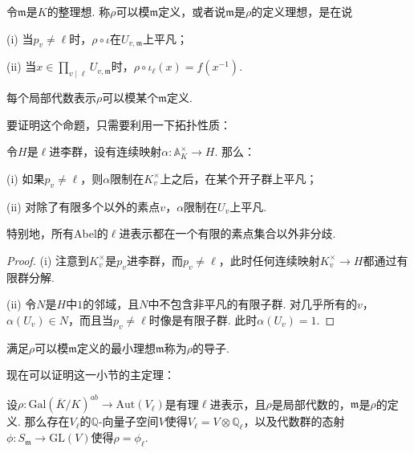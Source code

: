 \begin{cdef}
    令$\mathfrak{m}$是$K$的整理想. 称$\rho$可以模$\mathfrak{m}$定义，或者说$\mathfrak{m}$是$\rho$的定义理想，是在说

    (i) 当$p_v\neq \ell$时，$\rho\circ \iota$在$U_{v, \mathfrak{m}}$上平凡；

    (ii) 当$x\in \prod_{v\mid \ell} U_{v, \mathfrak{m}}$时，$\rho\circ\iota_{\ell} (x) = f(x^{-1})$.
\end{cdef}

\begin{cprop}
    每个局部代数表示$\rho$可以模某个$\mathfrak{m}$定义.
\end{cprop}

要证明这个命题，只需要利用一下拓扑性质：

\begin{clem}
    令$H$是$\ell$进李群，设有连续映射$\alpha: \mathbb{A}_{K}^{\times}\to H$. 那么：

    (i) 如果$p_v\neq \ell$，则$\alpha$限制在$K_v^{\times}$上之后，在某个开子群上平凡；

    (ii) 对除了有限多个以外的素点$v$，$\alpha$限制在$U_v$上平凡.

    特别地，所有Abel的$\ell$进表示都在一个有限的素点集合以外非分歧.
\end{clem}

\begin{proof}
    (i) 注意到$K_v^{\times}$是$p_v$进李群，而$p_v\neq \ell$，此时任何连续映射$K_v^{\times}\to H$都通过有限群分解.

    (ii) 令$N$是$H$中$1$的邻域，且$N$中不包含非平凡的有限子群. 对几乎所有的$v$，$\alpha(U_v)\in N$，而且当$p_v\neq \ell$时像是有限子群. 此时$\alpha(U_v)=1$.
\end{proof}

满足$\rho$可以模$\mathfrak{m}$定义的最小理想$\mathfrak{m}$称为$\rho$的导子.

现在可以证明这一小节的主定理：

\begin{cthm}
    设$\rho: \mathrm{Gal}(\overline{K}/K)^{ab} \to \mathrm{Aut}(V_{\ell})$是有理$\ell$进表示，且$\rho$是局部代数的，$\mathfrak{m}$是$\rho$的定义\modulus . 那么存在$V_{\ell}$的$\mathbb{Q}$-向量子空间$V$使得$V_{\ell} = V\otimes \mathbb{Q}_{\ell}$，以及代数群的态射$\phi: S_{\mathfrak{m}}\to \mathrm{GL}(V)$使得$\rho=\phi_{\ell}$. \label{galois::when_sm}
\end{cthm}


